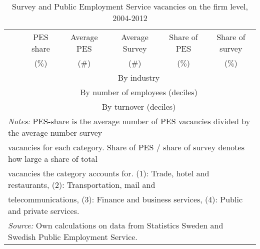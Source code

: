       \begin{table}[htbp]\centering
      \caption{\label{tab:PES_survey} Survey and Public Employment Service vacancies on the firm level, 2004-2012}
			\begin{tabularx} {\textwidth} { l X c  c  c c c} \\ \hline %
      
			\textbf{ } & &\scriptsize{PES share}  & \scriptsize{Average PES}  &  \scriptsize{Average Survey} &  \scriptsize{Share of PES} &  \scriptsize{Share of survey }  \\
			
			      \textbf{ } && \scriptsize{($\%$)}  & \scriptsize{($\#$)}  &  \scriptsize{($\#$)} &  \scriptsize{($\%$)} &  \scriptsize{($\%$)}  \\
			
      \midrule
			   && \multicolumn{5}{c}{By industry} \\
			\midrule

     \midrule
						   && \multicolumn{5}{c}{By number of employees (deciles)} \\
			\midrule

     \midrule
						   && \multicolumn{5}{c}{By turnover (deciles)} \\
			\midrule

				\hline
\multicolumn{7}{l}{\footnotesize{\emph{Notes:} PES-share is the average number of PES vacancies divided by the average number survey   }} \\
 \multicolumn{7}{l}{\footnotesize{vacancies for each category. Share of PES / share of survey denotes how large a share of total  }} \\
 \multicolumn{7}{l}{\footnotesize{vacancies the category accounts for. (1): Trade, hotel and restaurants, (2): Transportation, mail and}} \\
 \multicolumn{7}{l}{\footnotesize{telecommunications, (3): Finance and business services, (4): Public and private services. }}   \\
\multicolumn{7}{l}{\footnotesize{\emph{Source:} Own calculations on data from Statistics Sweden and Swedish Public Employment Service.}} 
      \end{tabularx}
      \end{table}
			

